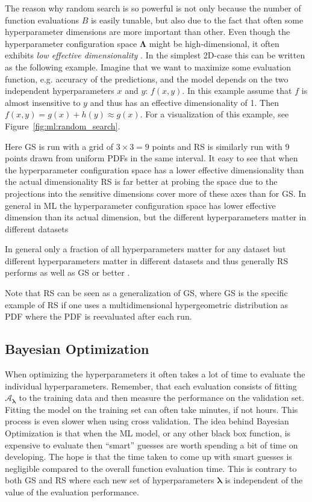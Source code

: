 \documentclass[a4paper, twoside, nobib]{tufte-book}
\newcommand{\q}[1]{``#1''}
\newcommand{\autocite}[1]{\citep{#1}}
\begin{document}
The reason why random search is so powerful is not only because the number of function evaluations $B$ is easily tunable, but also due to the fact that often some hyperparameter dimensions are more important than other. Even though the hyperparameter configuration space $\bm{\Lambda}$  might be high-dimensional, it often exhibits \emph{low effective dimensionality} \autocite{bergstraRandomSearchHyperparameter2012}. In the simplest 2D-case this can be written as the following example. Imagine that we want to maximize some evaluation function, e.g. accuracy of the predictions, and the model depends on the two independent hyperparameters $x$ and $y$: $f(x, y)$. In this example assume that $f$ is almost insensitive to $y$ and thus has an effective dimensionality of 1. Then $f(x,y) = g(x) + h(y) \approx g(x)$. For a visualization of this example, see Figure~\ref{fig:ml:random_search}.

Here GS is run with a grid of $3\times3 = 9$ points and RS is similarly run with 9 points drawn from uniform PDFs in the same interval. It easy to see that when the hyperparameter configuration space has a lower effective dimensionality than the actual dimensionality RS is far better at probing the space due to the projections into the sensitive dimensions cover more of these axes than for GS. In general in ML the hyperparameter configuration space has lower effective dimension than its actual dimension, but the different hyperparameters matter in different datasets

In general only a fraction of all hyperparameters matter for any dataset but different hyperparameters matter in different datasets and thus generally RS performs as well as GS or better \autocite{bergstraRandomSearchHyperparameter2012}. 

Note that RS can be seen as a generalization of GS, where GS is the specific example of RS if one uses a multidimensional hypergeometric distribution as PDF where the PDF is reevaluated after each run. 

\subsection{Bayesian Optimization}
\label{subsec:ml:bayesian_optimization}
When optimizing the hyperparameters it often takes a lot of time to evaluate the individual hyperparameters. Remember, that each evaluation consists of fitting $\mathcal{A}_{\bm{\lambda}}$ to the training data and then measure the performance on the validation set. Fitting the model on the training set can often take minutes, if not hours. This process is even slower when using cross validation. The idea behind Bayesian Optimization is that when the ML model, or any other black box function, is expensive to evaluate then \q{smart} guesses are worth spending a bit of time on developing. The hope is that the time taken to come up with smart guesses is negligible compared to the overall function evaluation time. This is contrary to both GS and RS where each new set of hyperparameters $\bm{\lambda}$ is independent of the value of the evaluation performance.
\end{document}
